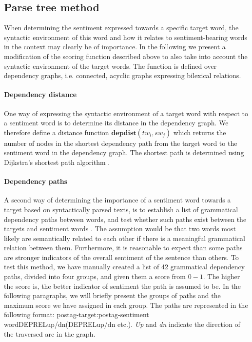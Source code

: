 \documentclass[11pt]{article}
\begin{document}
\subsection{Parse tree method}
\label{sec:dp}
When determining the sentiment expressed towards a specific target
word, the syntactic environment of this word and how it relates to
sentiment-bearing words in the context may clearly be of importance.
In the following we present a modification of the scoring function described above to also take into account the syntactic environment of the target words. The function is defined over dependency graphs, i.e. connected, acyclic graphs expressing bilexical relations.

\paragraph{Dependency distance} One way of expressing the syntactic environment of a target word with respect to a sentiment word is to determine its distance in the dependency graph. We therefore define a distance function $\mathbf{depdist}(tw_i, sw_{j})$ which returns the number of nodes in the shortest dependency path from the target word to the sentiment word in the dependency graph. The shortest path is determined using Dijkstra's shortest path algorithm \cite{Dij:59}.

\paragraph{Dependency paths}
A second way of determining the importance of a sentiment word towards a target based on syntactically parsed texts, is to establish a list of grammatical dependency paths between words, and test whether such paths exist between the targets and sentiment words \cite{Jiang11}. The assumption would be that two words most likely are semantically related to each other if there is a meaningful grammatical relation between them. Furthermore, it is reasonable to expect than some paths are stronger indicators of the overall sentiment of the sentence than others. To test this method, we have manually created a list of 42 grammatical dependency paths, divided into four groups, and given them a score from $0-1$. The higher the score is, the better indicator of sentiment the path is assumed to be. In the following paragraphs, we will briefly present the groups of paths and the maximum score we have assigned in each group. The paths are represented in the following format: postag-target:postag-sentiment word{\textunderscore}{\textunderscore}DEPREL{\textunderscore}up/dn({\textunderscore}{\textunderscore}DEPREL{\textunderscore}up/dn etc.). \emph{Up} and \emph{dn} indicate the direction of the traversed arc in the graph.
\end{document}
